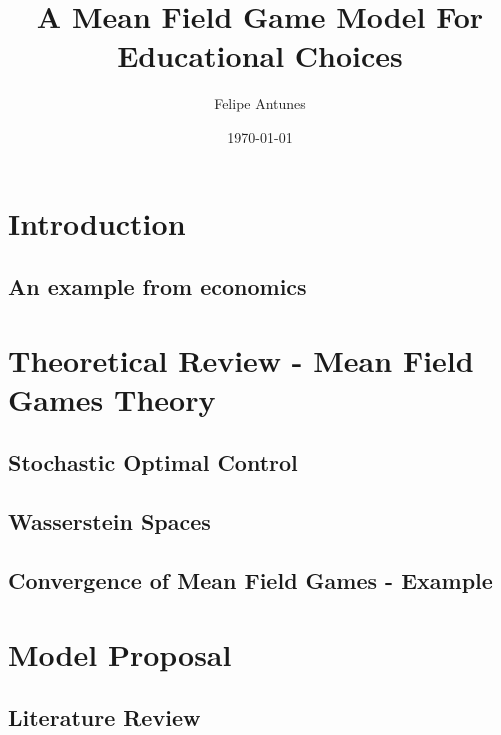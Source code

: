 \documentclass{article}
\title{A Mean Field Game Model For Educational Choices}
\author{Felipe Antunes}
\date{\today}
\begin{document}
\maketitle


\section{Introduction}


\subsection{An example from economics}


\section{Theoretical Review - Mean Field Games Theory}


\subsection{Stochastic Optimal Control}\label{theo_review:soc}



\subsection{Wasserstein Spaces}\label{theo_review:wass}


\subsection{Convergence of Mean Field Games - Example}\label{theo_review:mfg_convergence}



\section{Model Proposal}\label{model_proposal}

\subsection{Literature Review}\label{model_proposal:motivation}
\end{document}
